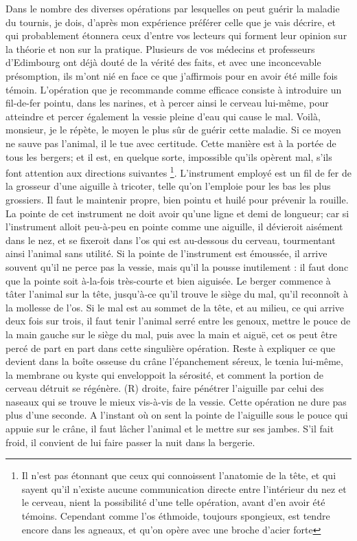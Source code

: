 Dans le nombre des diverses opérations par lesquelles on peut guérir la maladie du\setcounter{page}{250} tournis, je dois, d'après mon expérience préférer celle que je vais décrire, et qui probablement étonnera ceux d'entre vos lecteurs qui forment leur opinion sur la théorie et non sur la pratique. Plusieurs de vos médecins et professeurs d'Edimbourg ont déjà douté de la vérité des faits, et avec une inconcevable présomption, ils m'ont nié en face ce que j'affirmois pour en avoir été mille fois témoin. L'opération que je recommande comme efficace consiste à introduire un fil-de-fer pointu, dans les narines, et à percer ainsi le cerveau lui-même, pour atteindre et percer également la vessie pleine d'eau qui cause le mal. Voilà, monsieur, je le répète, le moyen le plus sûr de guérir cette maladie. Si ce moyen ne sauve pas l'animal, il le tue avec certitude. Cette manière est à la portée de tous les bergers; et il est, en quelque sorte, impossible qu'ils opèrent mal, s'ils font attention aux directions suivantes \footnote{Il n'est pas étonnant que ceux qui connoissent l'anatomie de la tête, et qui sayent qu'il n'existe aucune communication directe entre l'intérieur du nez et le cerveau, nient la possibilité d'une telle opération, avant d'en avoir été témoins. Cependant comme l'os éthmoide, toujours spongieux, est tendre encore dans les agneaux, et qu'on opère avec une broche d'acier forte}.\setcounter{page}{251} L'instrument employé est un fil de fer de la grosseur d'une aiguille à tricoter, telle qu'on l'emploie pour les bas les plus grossiers. Il faut le maintenir propre, bien pointu et huilé pour prévenir la rouille. La pointe de cet instrument ne doit avoir qu'une ligne et demi de longueur; car si l'instrument alloit peu-à-peu en pointe comme une aiguille, il dévieroit aisément dans le nez, et se fixeroit dans l'os qui est au-dessous du cerveau, tourmentant ainsi l'animal sans utilité. Si la pointe de l'instrument est émoussée, il arrive souvent qu'il ne perce pas la vessie, mais qu'il la pousse inutilement : il faut donc que la pointe soit à-la-fois très-courte et bien aiguisée. Le berger commence à tâter l'animal sur la tête, jusqu'à-ce qu'il trouve le siège du mal, qu'il reconnoît à la mollesse de l'os. Si le mal est au sommet de la tête, et au milieu, ce qui arrive deux fois sur trois, il faut tenir l'animal serré entre les genoux, mettre le pouce de la main gauche sur le siège du mal, puis avec la main et aiguë, cet os peut être percé de part en part dans cette singulière opération. Reste à expliquer ce que devient dans la boîte osseuse du crâne l'épanchement séreux, le tœnia lui-même, la membrane ou kyste qui enveloppoit la sérosité, et comment la portion de cerveau détruit se régénère. (R)\setcounter{page}{252} droite, faire pénétrer l'aiguille par celui des naseaux qui se trouve le mieux vis-à-vis de la vessie. Cette opération ne dure pas plus d'une seconde. A l'instant où on sent la pointe de l'aiguille sous le pouce qui appuie sur le crâne, il faut lâcher l'animal et le mettre sur ses jambes. S'il fait froid, il convient de lui faire passer la nuit dans la bergerie.
